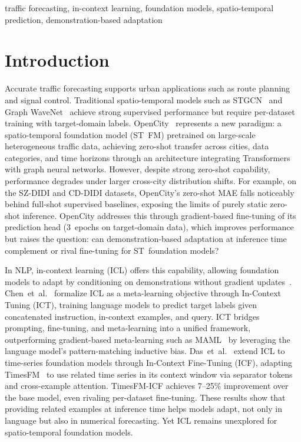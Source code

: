 \documentclass[conference]{IEEEtran}
\begin{document}
\begin{IEEEkeywords}
traffic forecasting, in-context learning, foundation models, spatio-temporal prediction, demonstration-based adaptation
\end{IEEEkeywords}

\section{Introduction}

Accurate traffic forecasting supports urban applications such as route planning and signal control.
Traditional spatio-temporal models such as STGCN~\cite{yu2018stgcn} and Graph WaveNet~\cite{wu2019graphwavenet} achieve strong supervised performance but require per-dataset training with target-domain labels.
OpenCity~\cite{li2024opencity} represents a new paradigm: a spatio-temporal foundation model (ST~FM) pretrained on large-scale heterogeneous traffic data, achieving zero-shot transfer across cities, data categories, and time horizons through an architecture integrating Transformers with graph neural networks.
However, despite strong zero-shot capability, performance degrades under larger cross-city distribution shifts.
For example, on the SZ-DIDI and CD-DIDI datasets, OpenCity's zero-shot MAE falls noticeably behind full-shot supervised baselines, exposing the limits of purely static zero-shot inference.
OpenCity addresses this through gradient-based fine-tuning of its prediction head (3~epochs on target-domain data), which improves performance but raises the question: can demonstration-based adaptation at inference time complement or rival fine-tuning for ST~foundation models?

In NLP, in-context learning (ICL) offers this capability, allowing foundation models to adapt by conditioning on demonstrations without gradient updates~\cite{brown2020gpt3}.
Chen~et~al.~\cite{chen2022ict} formalize ICL as a meta-learning objective through In-Context Tuning (ICT), training language models to predict target labels given concatenated instruction, in-context examples, and query.
ICT bridges prompting, fine-tuning, and meta-learning into a unified framework, outperforming gradient-based meta-learning such as MAML~\cite{finn2017maml} by leveraging the language model's pattern-matching inductive bias.
Das~et~al.~\cite{das2024icf} extend ICL to time-series foundation models through In-Context Fine-Tuning (ICF), adapting TimesFM~\cite{das2024timesfm} to use related time series in its context window via separator tokens and cross-example attention.
TimesFM-ICF achieves 7--25\% improvement over the base model, even rivaling per-dataset fine-tuning.
These results show that providing related examples at inference time helps models adapt, not only in language but also in numerical forecasting.
Yet ICL remains unexplored for spatio-temporal foundation models.
\end{document}
